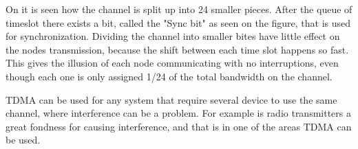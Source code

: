 On  it is seen how the channel is split up into 24 smaller pieces. 
After the queue of timeslot there exists a bit, called the "Sync bit" as seen on the figure, that is used for synchronization.
Dividing the channel into smaller bites have little effect on the nodes transmission, because the shift between each time slot happens so fast.
This gives the illusion of each node communicating with no interruptions, even though each one is only assigned 1/24 of the total bandwidth on the channel.

TDMA can be used for any system that require several device to use the same channel, where interference can be a problem.
For example is radio transmitters a great fondness for causing interference, and that is in one of the areas TDMA can be used.\cite{interferance_protocols}






